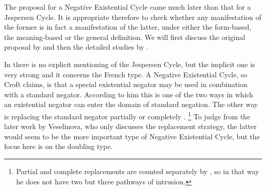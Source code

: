 ﻿\documentclass[output=paper]{langsci/langscibook}
\begin{document}
The proposal for a Negative Existential Cycle came much later than that for
a Jespersen Cycle. It is appropriate therefore to check whether any
manifestation of the former is in fact a manifestation of the latter, under
either the form-based, the meaning-based or the general definition. We will
first discuss the original proposal by \textcite{Croft1991} and then the
detailed studies by
\textcites{Veselinova2010}{Veselinova2013}{Veselinova2014}{Veselinova2015}{Veselinova2016}.

In \citet{Croft1991} there is no explicit mentioning of the Jespersen
Cycle, but the implicit one is very strong and it concerns the French type.
A Negative Existential Cycle, so Croft claims, is that a special
existential negator may be used in combination with a standard negator.
According to him this is one of the two ways in which an existential
negator can enter the domain of standard negation. The other way is
replacing the standard negator partially or completely
\parencite[9--11]{Croft1991}.%
%
    \footnote{Partial and complete replacements are counted separately by
    \textcite{Croft1991}, so in that way he does not have two but three
    pathways of intrusion.} %
%
To judge from the later work by
Veselinova, who only discusses the replacement strategy, the latter would
seem to be the more important type of Negative Existential Cycle, but the
focus here is on the doubling type. 
\end{document}

